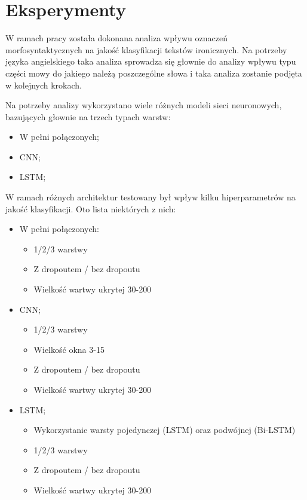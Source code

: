 \newpage %
\section{Eksperymenty}

W ramach pracy została dokonana analiza wpływu oznaczeń morfosyntaktycznych na jakość klasyfikacji tekstów ironicznych. Na potrzeby języka angielskiego taka analiza sprowadza się głownie do analizy wpływu typu części mowy do jakiego należą poszczególne słowa i taka analiza zostanie podjęta w kolejnych krokach.


Na potrzeby analizy wykorzystano wiele różnych modeli sieci neuronowych, bazujących głownie na trzech typach warstw:

\begin{itemize}
    \item W pełni połączonych;
    \item CNN;
    \item LSTM;
\end{itemize}

W ramach różnych architektur testowany był wpływ kilku hiperparametrów na jakość klasyfikacji. Oto lista niektórych z nich:
\begin{itemize}
    \item W pełni połączonych:
          \begin{itemize}
              \item  1/2/3 warstwy
              \item Z dropoutem / bez dropoutu
              \item Wielkość wartwy ukrytej 30-200
          \end{itemize}

    \item CNN;
          \begin{itemize}
              \item  1/2/3 warstwy
              \item Wielkość okna 3-15
              \item Z dropoutem / bez dropoutu
              \item Wielkość wartwy ukrytej 30-200
          \end{itemize}
    \item LSTM;
          \begin{itemize}
              \item Wykorzystanie warsty pojedynczej (LSTM) oraz podwójnej (Bi-LSTM)
              \item  1/2/3 warstwy
              \item Z dropoutem / bez dropoutu
              \item Wielkość wartwy ukrytej 30-200
          \end{itemize}
\end{itemize}

